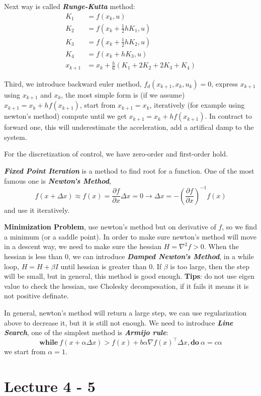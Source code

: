 \documentclass[10pt]{elegantbook}
\newcommand{\mydefination}[1]{\textbf{\textit{\textcolor{structurecolor}{#1}}}}
\begin{document}
Next way is called \mydefination{Runge-Kutta} method:
\begin{align*}
K_{1} & =f(x_{k},u) \\
K_{2} & =f(x_k+\frac{1}{2}hK_1,u) \\
K_{3} & =f(x_k+\frac{1}{2}hK_2,u) \\
K_{4} & =f(x_k+hK_3,u) \\
x_{k+1} & =x_k+\frac{h}{6}(K_1+2K_2+2K_3+K_4)
\end{align*}

Third, we introduce backward euler method, $f_d(x_{k+1}, x_k, u_k) = 0$, express $x_{k+1}$ using $x_{k+1}$ and $x_k$,
the most simple form is (if we assume) $x_{k+1} = x_k + hf(x_{k+1})$, start from $x_{k+1} = x_k$, iteratively (for
example using newton's method) compute until we get $x_{k+1} = x_k + hf(x_{k+1})$. In contract to forward one, this
will underestimate the acceleration, add a artifical damp to the system.

For the discretization of control, we have zero-order and first-order hold.

\mydefination{Fixed Point Iteration} is a method to find root for a function.
One of the most famous one is \mydefination{Newton's Method}, 
\[ f(x + \Delta x) \approx f(x) = \frac{\partial f}{\partial x} \Delta x = 0 \rightarrow 
\Delta x = -(\frac{\partial f}{\partial x})^{-1}f(x) \]
and use it iteratively.

\textbf{Minimization Problem}, use newton's method but on derivative of $f$, so we find a minimum (or a saddle point).
In order to make sure newton's method will move in a descent way, we need to make sure the hessian $H = \nabla^2 f > 0$.
When the hessian is less than 0, we can introduce \mydefination{Damped Newton's Method}, in a while loop, $H = H + \beta I$
until hessian is greater than 0. If $\beta$ is too large, then the step will be small, but in general, this method is good
enough. \textbf{Tips}: do not use eigen value to check the hessian, use Cholesky decompesation, if it fails it means it is not
positive definate.

In general, newton's method will return a large step, we can use regularization above to decrease it, but it is still not
enough. We need to introduce \mydefination{Line Search}, one of the simplest method is \mydefination{Armijo rule}:
\[\textbf{while} ~ f(x + \alpha \Delta x) > f(x) + b\alpha \nabla f(x)^{\top} \Delta x, \textbf{do} ~ \alpha = c\alpha\]
we start from $\alpha = 1$.

\section{Lecture 4 - 5}
\end{document}
